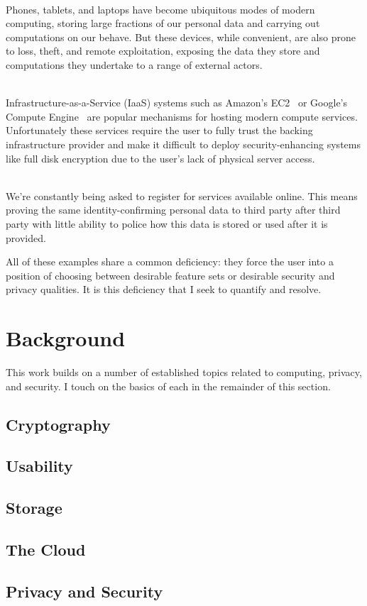 \begin{packed_desc}
\item[Mobile Computing Devices] \hfill \\ Phones, tablets, and laptops
  have become ubiquitous modes of modern computing, storing large
  fractions of our personal data and carrying out computations on our
  behave. But these devices, while convenient, are also prone to loss,
  theft, and remote exploitation, exposing the data they store and
  computations they undertake to a range of external actors.
\item[Cloud Computing Infrastructure] \hfill
  \\ Infrastructure-as-a-Service (IaaS) systems such as Amazon's
  EC2~\cite{amazon-ec2} or Google's Compute
  Engine~\cite{google-compute} are popular mechanisms for hosting
  modern compute services. Unfortunately these services require the
  user to fully trust the backing infrastructure provider and make it
  difficult to deploy security-enhancing systems like full disk
  encryption due to the user's lack of physical server access.
\item[User Account Registration] \hfill \\ We're constantly being asked to
  register for services available online. This means proving the same
  identity-confirming personal data to third party after third party
  with little ability to police how this data is stored or used after
  it is provided.
\end{packed_desc}

All of these examples share a common deficiency: they force the user
into a position of choosing between desirable feature sets or desirable
security and privacy qualities. It is this deficiency that I seek to
quantify and resolve.

\section{Background}

This work builds on a number of established topics related to
computing, privacy, and security. I touch on the basics of each in
the remainder of this section.

\subsection{Cryptography}

\subsection{Usability}

\subsection{Storage}

\subsection{The Cloud}

\subsection{Privacy and Security}

